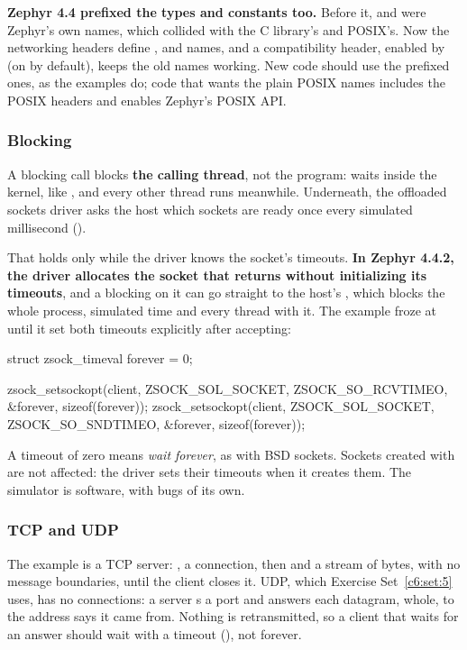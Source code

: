 \textbf{Zephyr 4.4 prefixed the types and constants too.} Before it,  and
 were Zephyr’s own names, which collided with the C library’s and POSIX’s. Now the
networking headers define ,  and  names, and a compatibility
header, enabled by  (on by default), keeps the old names
working. New code should use the prefixed ones, as the examples do; code that wants the plain POSIX
names includes the POSIX headers and enables Zephyr’s POSIX API.

\subsubsection{Blocking}
A blocking call blocks \textbf{the calling thread}, not the program:  waits
inside the kernel, like , and every other thread runs meanwhile. Underneath, the
offloaded sockets driver asks the host which sockets are ready once every simulated millisecond
().

That holds only while the driver knows the socket’s timeouts. \textbf{In Zephyr 4.4.2, the driver
allocates the socket that  returns without initializing its timeouts}, and a
blocking  on it can go straight to the host’s , which blocks the
whole process, simulated time and every thread with it. The 
example froze at  until it set both timeouts explicitly after accepting:

\begin{ccode}
struct zsock_timeval forever = {0};

zsock_setsockopt(client, ZSOCK_SOL_SOCKET, ZSOCK_SO_RCVTIMEO, &forever, sizeof(forever));
zsock_setsockopt(client, ZSOCK_SOL_SOCKET, ZSOCK_SO_SNDTIMEO, &forever, sizeof(forever));
\end{ccode}

A timeout of zero means \emph{wait forever}, as with BSD sockets. Sockets created with
 are not affected: the driver sets their timeouts when it creates them. The
simulator is software, with bugs of its own.

\subsubsection{TCP and UDP}
The  example is a TCP server: ,  a
connection, then  and  a stream of bytes, with no message boundaries,
until the client closes it. UDP, which Exercise Set~\ref{c6:set:5} uses, has no connections: a
server s a port and answers each datagram, whole, to the address  says
it came from. Nothing is retransmitted, so a client that waits for an answer should wait with a
timeout (), not forever.

